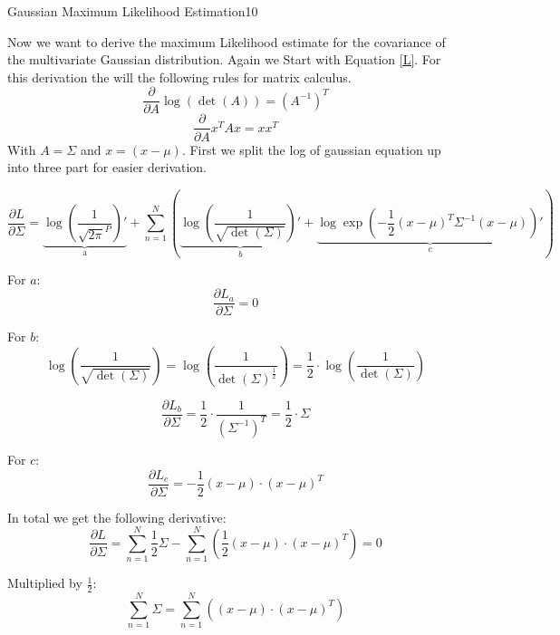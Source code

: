\begin{questions}
\begin{question}{Gaussian Maximum Likelihood Estimation}{10}
\begin{answer}
Now we want to derive the maximum Likelihood estimate for the covariance of the multivariate Gaussian distribution. Again we Start with Equation \eqref{L}.
For this derivation the will the following rules for matrix calculus.
\begin{equation}
	\frac{\partial}{\partial A} \log(\det(A)) = (A^{-1})^T
\end{equation}
\begin{equation}
	\frac{\partial}{\partial A}x^T A x = xx^T
\end{equation}
With $A = \Sigma$ and $x = (x-\mu)$.
First we split the log of gaussian equation up into three part for easier derivation.

\begin{equation}
\frac{\partial L}{\partial \Sigma} = \underbrace{\log(\frac{1}{\sqrt{2\pi}^P})'}_{\text{a}} + \sum_{n=1}^{N}(\underbrace{\log(\frac{1}{\sqrt{\det(\Sigma)}})'}_{b} + \underbrace{\log \exp (-\frac{1}{2} (x-\mu)^T \Sigma^{-1}(x-\mu))'}_{c})
\end{equation}

For $a$:
\begin{equation}
	\frac{\partial L_a}{\partial \Sigma} = 0
\end{equation}

For $b$:
\begin{equation}
	\log(\frac{1}{\sqrt{\det(\Sigma)}}) = \log(\frac{1}{\det(\Sigma)^{\frac{1}{2}}}) = \frac{1}{2}\cdot\log(\frac{1}{\det(\Sigma)})
\end{equation}

\begin{equation}
\frac{\partial L_b}{\partial \Sigma} = \frac{1}{2}\cdot\frac{1}{(\Sigma^{-1})^T} = \frac{1}{2} \cdot \Sigma
\end{equation}

For $c$:
\begin{equation}
	\frac{\partial L_c}{\partial \Sigma} = -\frac{1}{2}(x - \mu)\cdot(x - \mu)^T
\end{equation}

In total we get the following derivative:
\begin{equation}
	\frac{\partial L}{\partial \Sigma} = \sum_{n=1}^{N}\frac{1}{2}\Sigma - \sum_{n=1}^{N}(\frac{1}{2}(x - \mu)\cdot(x - \mu)^T) = 0
\end{equation}

Multiplied by $\frac{1}{2}$:
\begin{equation}
	\sum_{n=1}^{N} \Sigma = \sum_{n=1}^{N}((x - \mu)\cdot(x - \mu)^T)
\end{equation}


\end{answer}
\end{question}
\end{questions}
